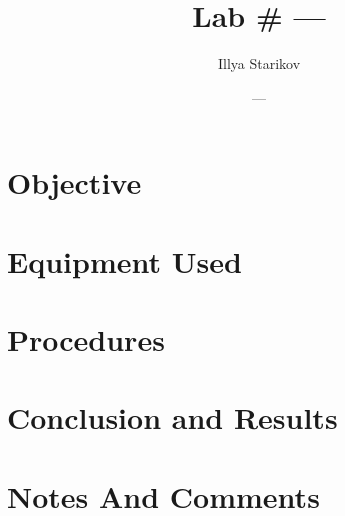 \documentclass{article}
\begin{document}
\title{Lab \# —}
\date{—}
\author{Illya Starikov}
\maketitle

\section{Objective}
\section{Equipment Used}
\section{Procedures}
\section{Conclusion and Results}
\section{Notes And Comments}
\end{document}
